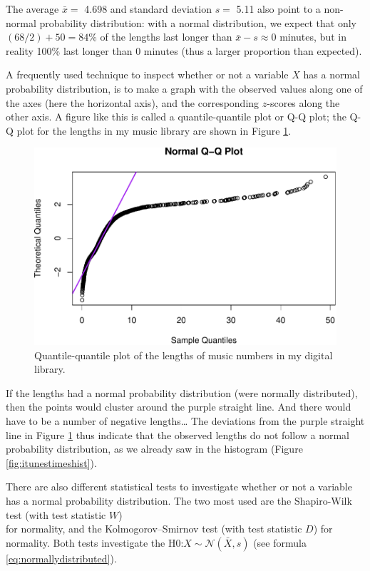 \documentclass[
]{book}
\begin{document}
The average \(\bar{x} =\) 4.698 and
standard deviation \(s =\) 5.11 also
point to a non-normal probability distribution:
with a normal distribution, we expect that only \((68/2)+50=84\)\% of the lengths
last longer than
\(\bar{x}-s\approx 0\) minutes, but in reality 100\% last longer
than 0 minutes (thus a larger proportion than expected).

A frequently used technique to inspect whether or not a variable \(X\) has a
normal probability distribution, is to make a graph with the
observed values along one of the axes (here the horizontal axis), and the
corresponding
\(z\)-scores
along the other axis. A figure like this is called a quantile-quantile plot or
Q-Q plot; the Q-Q plot for the lengths in my music library are shown in
Figure \ref{fig:itunestimesqqplot}.

\begin{figure}
\centering
\includegraphics{QMS-EN_files/figure-latex/itunestimesqqplot-1.pdf}
\caption{\label{fig:itunestimesqqplot}Quantile-quantile plot of the lengths of music numbers in my digital library.}
\end{figure}

If the lengths had a normal probability distribution (were normally
distributed), then the points would cluster around the purple straight line. And there would have to be a number of negative lengths\ldots{} The deviations from the purple straight line in
Figure \ref{fig:itunestimesqqplot} thus indicate that the observed lengths
do not follow a normal probability distribution, as we already saw in the
histogram (Figure \ref{fig:itunestimeshist}).

There are also different statistical tests to investigate whether or not a variable
has a normal probability distribution. The two most used are the
Shapiro-Wilk test (with test statistic \(W\))\\
for normality, and the Kolmogorov--Smirnov test (with test statistic \(D\)) for
normality. Both tests investigate the
H0:\(X\sim\mathcal{N}(\bar{X},s)\) (see
formula \eqref{eq:normallydistributed}).
\end{document}
